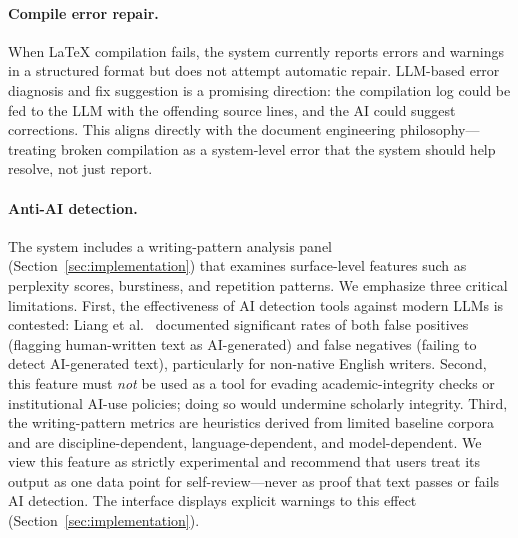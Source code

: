 \paragraph{Compile error repair.} When \LaTeX{} compilation fails, the system
currently reports errors and warnings in a structured format but does not
attempt automatic repair. LLM-based error diagnosis and fix suggestion is a
promising direction: the compilation log could be fed to the LLM with the
offending source lines, and the AI could suggest corrections. This aligns
directly with the document engineering philosophy---treating broken
compilation as a system-level error that the system should help resolve, not
just report.

\paragraph{Anti-AI detection.} The system includes a writing-pattern analysis
panel (Section~\ref{sec:implementation}) that examines surface-level features
such as perplexity scores, burstiness, and repetition patterns. We emphasize
three critical limitations. First, the effectiveness of AI detection tools
against modern LLMs is contested: Liang et al.~\cite{liang2024llmwriting}
documented significant rates of both false positives (flagging human-written
text as AI-generated) and false negatives (failing to detect AI-generated
text), particularly for non-native English writers. Second, this feature must
\emph{not} be used as a tool for evading academic-integrity checks or
institutional AI-use policies; doing so would undermine scholarly integrity.
Third, the writing-pattern metrics are heuristics derived from limited
baseline corpora and are discipline-dependent, language-dependent, and
model-dependent. We view this feature as strictly experimental and recommend
that users treat its output as one data point for self-review---never as proof
that text passes or fails AI detection. The interface displays explicit
warnings to this effect (Section~\ref{sec:implementation}).
